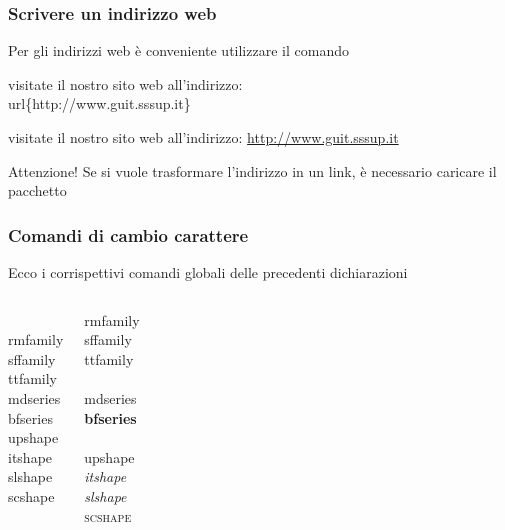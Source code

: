\documentclass[svgnames,%
	ucs,%
	pdftex]{guitbeamer}
\begin{document}
\begin{frame}
  \frametitle{Scrivere un indirizzo web}
	Per gli indirizzi web \`e conveniente utilizzare il comando 
	\begin{LaTeXcode}
		visitate il nostro sito web all'indirizzo:
		\alert{\\url\{http://www.guit.sssup.it\}}
	\end{LaTeXcode}
	\begin{LaTeXoutput}
		visitate il nostro sito web all'indirizzo:
		\url{http://www.guit.sssup.it}
	\end{LaTeXoutput}
	\begin{block}{Attenzione!}
		Se si vuole trasformare l'indirizzo in un link, \`e necessario caricare il pacchetto 
	\end{block}
\end{frame}
\begin{frame}
  \frametitle{Comandi di cambio carattere}
	Ecco i corrispettivi comandi globali delle precedenti dichiarazioni
	\begin{columns}
		\begin{LaTeXcode}
			\\rmfamily\n
			\\sffamily\n
			\\ttfamily\nn
			\\mdseries\n
			\\bfseries\nn
			\\upshape\n
			\\itshape\n
			\\slshape\n
			\\scshape
		\end{LaTeXcode}
		\begin{LaTeXoutput}[]
			{\rmfamily rmfamily}\\
			{\sffamily sffamily}\\
			{\ttfamily ttfamily}\\
			\ \\
			{\mdseries mdseries}\\
			{\bfseries bfseries}\\
			\ \\
			{\upshape upshape}\\
			\textit{itshape}\\
			{\slshape slshape}\\
			{\scshape scshape}
		\end{LaTeXoutput}
	\end{columns}
\end{frame}
\end{document}
